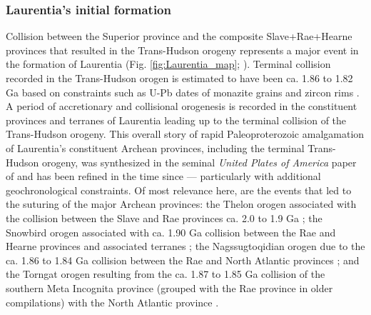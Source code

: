 \documentclass[twocolumn, switch]{article} %
\begin{document}
\subsubsection{Laurentia's initial formation}
Collision between the Superior province and the composite Slave+Rae+Hearne provinces that resulted in the Trans-Hudson orogeny represents a major event in the formation of Laurentia (Fig. \ref{fig:Laurentia_map}; \citealp{Corrigan2009a}). Terminal collision recorded in the Trans-Hudson orogen is estimated to have been ca. 1.86 to 1.82 Ga based on constraints such as U-Pb dates of monazite grains and zircon rims \citep{Skipton2016a, Weller2017a}. A period of accretionary and collisional orogenesis is recorded in the constituent provinces and terranes of Laurentia leading up to the terminal collision of the Trans-Hudson orogeny. This overall story of rapid Paleoproterozoic amalgamation of Laurentia's constituent Archean provinces, including the terminal Trans-Hudson orogeny, was synthesized in the seminal \textit{United Plates of America} paper of \citet{Hoffman1988a} and has been refined in the time since --- particularly with additional geochronological constraints. Of most relevance here, are the events that led to the suturing of the major Archean provinces: the Thelon orogen associated with the collision between the Slave and Rae provinces ca. 2.0 to 1.9 Ga \citep{Hoffman1989c}; the Snowbird orogen associated with ca. 1.90 Ga collision between the Rae and Hearne provinces and associated terranes \citep{Berman2007a, Thiessen2020a}; the Nagssugtoqidian orogen due to the ca. 1.86 to 1.84 Ga collision between the Rae and North Atlantic provinces \citep{St-Onge2009a}; and the Torngat orogen resulting from the ca. 1.87 to 1.85 Ga collision of the southern Meta Incognita province (grouped with the Rae province in older compilations) with the North Atlantic province \citep{St-Onge2009a}.
\end{document}
